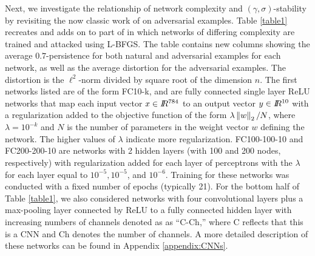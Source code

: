 Next, we investigate the relationship of network complexity and $(\gamma,\sigma)$-stability by revisiting the now classic work of \citet{szegedy2013} on adversarial examples. 
%
Table \ref{table1} recreates and adds on to part of \cite[Table 1]{szegedy2013} in which networks of differing complexity are trained and attacked using L-BFGS. The table contains new columns showing the average $0.7$-persistence for both natural and adversarial examples for each network, as well as the average distortion for the adversarial examples. The distortion is the $\ell^2$-norm divided by square root of the dimension $n$. The first networks listed are of the form FC10-k, and are fully connected single layer ReLU networks that map each input vector $x \in I\!\!R^{784}$ to an output vector $y \in I\!\!R^{10}$ with a regularization added to the objective function of the form $\lambda\left\Vert w \right\Vert_2/N$, where $\lambda = 10^{-k}$ and $N$ is the number of parameters in the weight vector $w$ defining the network. The higher values of $\lambda$ indicate more regularization.  
FC100-100-10 and FC200-200-10 are networks with 2 hidden layers (with 100 and 200 nodes, respectively) with regularization added for each layer of perceptrons with the $\lambda$ for each layer equal to $10^{-5}, 10^{-5}$, and  $10^{-6}$. Training for these networks was conducted with a fixed number of epochs (typically 21). For the bottom half of Table \ref{table1}, we also considered networks with four convolutional layers plus a max-pooling layer connected by ReLU to a fully connected hidden layer with increasing numbers of channels denoted as as ``C-Ch,'' where C reflects that this is a CNN and Ch denotes the number of channels. A more detailed description of these networks can be found in Appendix \ref{appendix:CNNs}.

